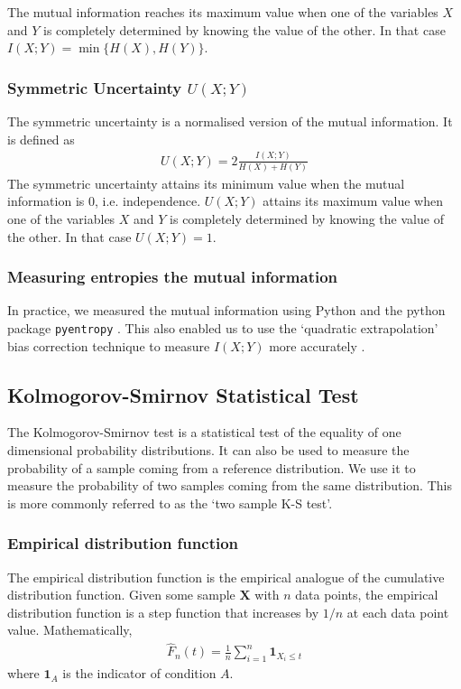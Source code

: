 \documentclass[a4paper,12pt]{article}
\theoremstyle{definition}
\begin{document}
The mutual information reaches its maximum value when one of the variables $X$ and $Y$ is completely determined by knowing the value of the other. In that case $I(X;Y) = \min \lbrace H(X), H(Y) \rbrace$.

\subsubsection{Symmetric Uncertainty $U(X;Y)$}
The symmetric uncertainty is a normalised version of the mutual information. It is defined as
\begin{align}\label{eq:symmetric_uncertainty}
  U(X;Y) = 2 \frac{I(X;Y)}{H(X) + H(Y)}
\end{align}
The symmetric uncertainty attains its minimum value when the mutual information is $0$, i.e. independence. $U(X;Y)$ attains its maximum value when one of the variables $X$ and $Y$ is completely determined by knowing the value of the other. In that case $U(X;Y) = 1$.

\subsubsection{Measuring entropies the mutual information}
In practice, we measured the mutual information using Python and the python package \texttt{pyentropy} \cite{ince}. This also enabled us to use the `quadratic extrapolation' bias correction technique to measure $I(X;Y)$ more accurately \cite{strong, treves}.

\subsection{Kolmogorov-Smirnov Statistical Test}\label{sec:ks_test}
The Kolmogorov-Smirnov test is a statistical test of the equality of one dimensional probability distributions. It can also be used to measure the probability of a sample coming from a reference distribution. We use it to measure the probability of two samples coming from the same distribution. This is more commonly referred to as the `two sample K-S test'.

\subsubsection{Empirical distribution function}
The empirical distribution function is the empirical analogue of the cumulative distribution function. Given some sample $\mathbf{X}$ with $n$ data points, the empirical distribution function is a step function that increases by $1/n$ at each data point value. Mathematically,
\begin{align}
  \hat{F}_{n}(t) = \frac{1}{n} \sum_{i=1}^n \mathbf{1}_{X_i \leq t}
\end{align}
where $\mathbf{1}_{A}$ is the indicator of condition $A$.
\end{document}
